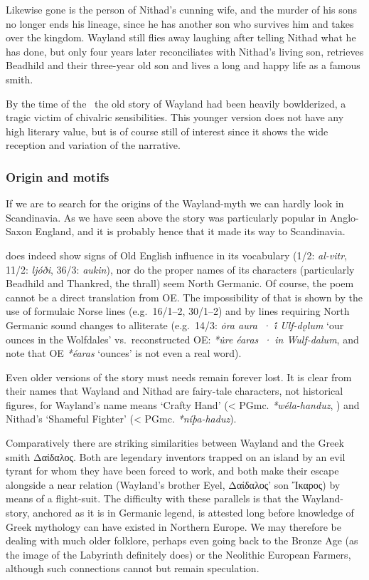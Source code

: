 Likewise gone is the person of Nithad’s cunning wife, and the murder of his sons no longer ends his lineage, since he has another son who survives him and takes over the kingdom. Wayland still flies away laughing after telling Nithad what he has done, but only four years later reconciliates with Nithad’s living son, retrieves Beadhild and their three-year old son and lives a long and happy life as a famous smith.

By the time of the \ThidreksSaga\ the old story of Wayland had been heavily bowlderized, a tragic victim of chivalric sensibilities.  This younger version does not have any high literary value, but is of course still of interest since it shows the wide reception and variation of the narrative.

\subsubsection{Origin and motifs}

If we are to search for the origins of the Wayland-myth we can hardly look in Scandinavia.  As we have seen above the story was particularly popular in Anglo-Saxon England, and it is probably hence that it made its way to Scandinavia.

 does indeed show signs of Old English influence in its vocabulary (1/2: \emph{al-vitr}, 11/2: \emph{ljóði}, 36/3: \emph{aukin}), nor do the proper names of its characters (particularly Beadhild and Thankred, the thrall) seem North Germanic.  Of course, the poem cannot be a direct translation from OE.  The impossibility of that is shown by the use of formulaic Norse lines (e.g.~16/1--2, 30/1--2) and by lines requiring North Germanic sound changes to alliterate (e.g.~14/3: \emph{ȯra aura~· i̇́ Ulf-dǫlum} ‘our ounces in the Wolfdales’ vs.~reconstructed OE: \emph{*u̇re éaras~· in Wulf-dalum}, and note that OE \emph{*éaras} ‘ounces’ is not even a real word).

Even older versions of the story must needs remain forever lost.  It is clear from their names that Wayland and Nithad are fairy-tale characters, not historical figures, for Wayland’s name means ‘Crafty Hand’ (< PGmc. \emph{*wéla-handuz}, \cite{Brate1908}) and Nithad’s ‘Shameful Fighter’ (< PGmc. \emph{*níþa-haduz}).

Comparatively there are striking similarities between Wayland and the Greek smith \textgreek{Δαίδαλος}.  Both are legendary inventors trapped on an island by an evil tyrant for whom they have been forced to work, and both make their escape alongside a near relation (Wayland’s brother Eyel, \textgreek{Δαίδαλος}’ son \textgreek{Ἴκαρος}) by means of a flight-suit.  The difficulty with these parallels is that the Wayland-story, anchored as it is in Germanic legend, is attested long before knowledge of Greek mythology can have existed in Northern Europe.  We may therefore be dealing with much older folklore, perhaps even going back to the Bronze Age (as the image of the Labyrinth definitely does) or the Neolithic European Farmers, although such connections cannot but remain speculation.

